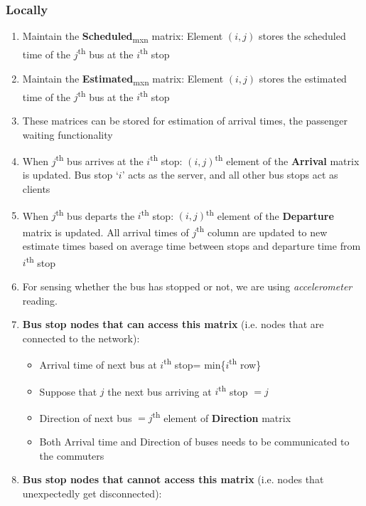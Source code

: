 \subsubsection{Locally}

\begin{enumerate}

    \item Maintain the \textbf{Scheduled}\textsubscript{mxn} matrix: Element $(i, j)$ stores the scheduled time of the $j$\textsuperscript{th} bus at the $i$\textsuperscript{th} stop
    \item Maintain the \textbf{Estimated}\textsubscript{mxn} matrix: Element $(i, j)$ stores the estimated time of the $j$\textsuperscript{th} bus at the $i$\textsuperscript{th} stop
    \item These matrices can be stored for estimation of arrival times, the passenger waiting functionality
    \item When $j$\textsuperscript{th} bus arrives at the $i$\textsuperscript{th} stop: $(i, j)$\textsuperscript{th} element of the \textbf{Arrival} matrix is updated. Bus stop `$i$' acts as the server, and all other bus stops act as clients
    \item When $j$\textsuperscript{th} bus departs the $i$\textsuperscript{th} stop: $(i, j)$\textsuperscript{th} element of the \textbf{Departure} matrix is updated. All arrival times of $j$\textsuperscript{th} column are updated to new estimate times based on average time between stops and departure time from $i$\textsuperscript{th} stop
    \item For sensing whether the bus has stopped or not, we are using \textit{\gls{accelerometer}} reading.
    \item \textbf{Bus stop nodes that can access this matrix} (i.e. nodes that are connected to the network):
          \begin{itemize}
              \item Arrival time of next bus at $i$\textsuperscript{th} stop= min\{$i$\textsuperscript{th} row\}
              \item Suppose that $j$ the next bus arriving at $i$\textsuperscript{th} stop $= j$
              \item Direction of next bus $= j$\textsuperscript{th} element of \textbf{Direction} matrix
              \item Both Arrival time and Direction of buses needs to be communicated to the commuters
          \end{itemize}
    \item \textbf{Bus stop nodes that cannot access this matrix} (i.e. nodes that unexpectedly get disconnected):

\end{enumerate}
